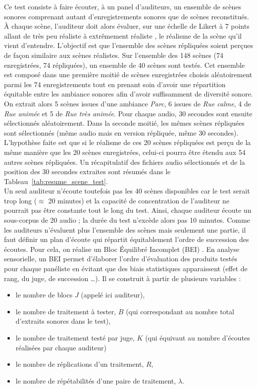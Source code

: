 Ce test consiste à faire écouter, à un panel d'auditeurs, un ensemble de scènes sonores comprenant autant d'enregistrements sonores que de scènes reconstitués. À chaque scène, l'auditeur doit alors évaluer, sur une échelle de Likert à 7 points allant de \og très peu réaliste \fg{} à \og extrêmement réaliste \fg{}, le réalisme de la scène qu'il vient d'entendre. L'objectif est que l'ensemble des scènes répliquées soient perçues de façon similaire aux scènes réalistes.
Sur l'ensemble des 148 scènes (74 enregistrées, 74 répliquées), un ensemble de 40 scènes sont testés.
Cet ensemble est composé dans une première moitié de scènes enregistrées choisis aléatoirement parmi les 74 enregistrements tout en prenant soin d'avoir une répartition équitable entre les ambiance sonores afin d'avoir suffisamment de diversité sonore. On extrait alors 5 scènes issues d'une ambiance \textit{Parc}, 6 issues de \textit{Rue calme}, 4 de \textit{Rue animée} et 5 de \textit{Rue très animée}. Pour chaque audio, 30 secondes sont ensuite sélectionnés aléatoirement.
Dans la seconde moitié, les mêmes scènes répliquées sont sélectionnés (même audio mais en version répliquée, même 30 secondes). L'hypothèse faite est que si le réalisme de ces 20 scènes répliquées est perçu de la même manière que les 20 scènes enregistrées, celui-ci pourra être étendu aux 54 autres scènes répliquées. Un récapitulatif des fichiers audio sélectionnés et de la position des 30 secondes extraites sont résumés dans le Tableau~\ref{tab:resume_scene_test}.\\



Un seul auditeur n'écoute toutefois pas les 40 scènes disponibles car le test serait trop long ($\approx$ 20 minutes) et la capacité de concentration de l'auditeur ne pourrait pas être constante tout le long du test. Ainsi, chaque auditeur écoute un sous-corpus de 20 audio ; la durée du test n'excède alors pas 10 minutes. Comme les auditeurs n'évaluent plus l'ensemble des scènes mais seulement une partie, il faut définir un plan d'écoute qui répartit équitablement l'ordre de succession des écoutes. Pour cela, on réalise un \og Bloc Équilibré Incomplet \fg{} (BEI) \cite{pages_blocs_2007}.
En analyse sensorielle, un BEI permet d'élaborer l'ordre d'évaluation des produits testés pour chaque panéliste en évitant que des biais statistiques apparaissent (effet de rang, du juge, de succession \dots). Il se construit à partir de plusieurs variables :

\begin{itemize}
\item le nombre de blocs $J$ (appelé ici auditeur),
\item le nombre de traitement à tester, $B$ (qui correspondant au nombre total d'extraits sonores dans le test),
\item le nombre de traitement testé par juge, $K$ (qui équivaut au nombre d'écoutes réalisées par chaque auditeur)
\item le nombre de réplications d'un traitement, $R$,
\item le nombre de répétabilités d'une paire de traitement, $\lambda$.\\
\end{itemize}


